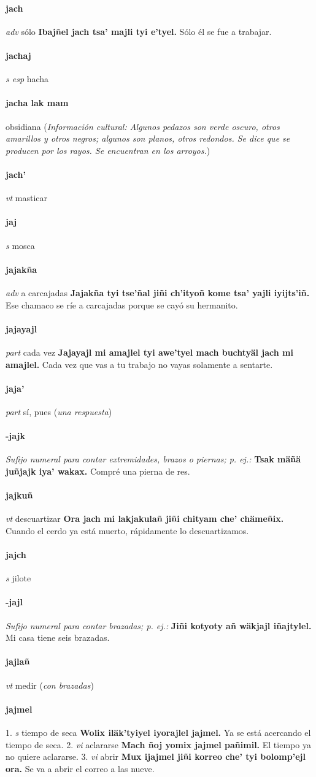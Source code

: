 \documentclass{scrbook}
\newcommand{\entry}[1]{\paragraph{#1}}
\newcommand{\onedefinition}[1]{#1.}
\newcommand{\nontranslationdef}[1]{\textit{#1}}
\newcommand{\partofspeech}[1]{\textit{#1}}
\newcommand{\spanishtranslation}[1]{#1}
\newcommand{\clarification}[1]{(\textit{#1})}
\newcommand{\cholexample}[1]{\textbf{#1}}
\newcommand{\exampletranslation}[1]{#1}
\newcommand{\culturalinformation}[1]{(\textit{#1})}
\begin{document}
\begin{multicols}{2}
\entry{jach}
\partofspeech{adv}
\spanishtranslation{sólo}
\cholexample{Ibajñel jach tsa' majli tyi e'tyel.}
\exampletranslation{Sólo él se fue a trabajar.}

\entry{jachaj}
\partofspeech{s esp}
\spanishtranslation{hacha}

\entry{jacha lak mam}
\spanishtranslation{obsidiana}
\culturalinformation{Información cultural: Algunos pedazos son verde oscuro, otros amarillos y otros negros; algunos son planos, otros redondos. Se dice que se producen por los rayos. Se encuentran en los arroyos.}

\entry{jach'}
\partofspeech{vt}
\spanishtranslation{masticar}

\entry{jaj}
\partofspeech{s}
\spanishtranslation{mosca}

\entry{jajakña}
\partofspeech{adv}
\spanishtranslation{a carcajadas}
\cholexample{Jajakña tyi tse'ñal jiñi ch'ityoñ kome tsa' yajli iyijts'iñ.}
\exampletranslation{Ese chamaco se ríe a carcajadas porque se cayó su hermanito.}

\entry{jajayajl}
\partofspeech{part}
\spanishtranslation{cada vez}
\cholexample{Jajayajl mi amajlel tyi awe'tyel mach buchtyäl jach mi amajlel.}
\exampletranslation{Cada vez que vas a tu trabajo no vayas solamente a sentarte.}

\entry{jaja'}
\partofspeech{part}
\spanishtranslation{sí, pues}
\clarification{una respuesta}

\entry{-jajk}
\nontranslationdef{Sufijo numeral para contar extremidades, brazos o piernas; p. ej.:}
\cholexample{Tsak mäñä juñjajk iya' wakax.}
\exampletranslation{Compré una pierna de res.}

\entry{jajkuñ}
\partofspeech{vt}
\spanishtranslation{descuartizar}
\cholexample{Ora jach mi lakjakulañ jiñi chityam che' chämeñix.}
\exampletranslation{Cuando el cerdo ya está muerto, rápidamente lo descuartizamos.}

\entry{jajch}
\partofspeech{s}
\spanishtranslation{jilote}

\entry{-jajl}
\nontranslationdef{Sufijo numeral para contar brazadas; p. ej.:}
\cholexample{Jiñi kotyoty añ wäkjajl iñajtylel.}
\exampletranslation{Mi casa tiene seis brazadas.}

\entry{jajlañ}
\partofspeech{vt}
\spanishtranslation{medir}
\clarification{con brazadas}

\entry{jajmel}
\onedefinition{1}
\partofspeech{s}
\spanishtranslation{tiempo de seca}
\cholexample{Wolix iläk'tyiyel iyorajlel jajmel.}
\exampletranslation{Ya se está acercando el tiempo de seca.}
\onedefinition{2}
\partofspeech{vi}
\spanishtranslation{aclararse}
\cholexample{Mach ñoj yomix jajmel pañimil.}
\exampletranslation{El tiempo ya no quiere aclararse.}
\onedefinition{3}
\partofspeech{vi}
\spanishtranslation{abrir}
\cholexample{Mux ijajmel jiñi korreo che' tyi bolomp'ejl ora.}
\exampletranslation{Se va a abrir el correo a las nueve.}


\end{multicols}
\end{document}
